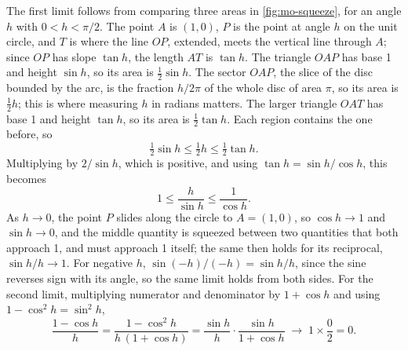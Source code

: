 The first limit follows from comparing three areas in
\cref{fig:mo-squeeze}, for an angle $h$ with $0 < h < \pi/2$. The point $A$
is $(1, 0)$, $P$ is the point at angle $h$ on the unit circle, and $T$ is
where the line $OP$, extended, meets the vertical line through $A$; since
$OP$ has slope $\tan h$, the length $AT$ is $\tan h$. The triangle $OAP$
has base 1 and height $\sin h$, so its area is $\tfrac12\sin h$. The
sector $OAP$, the slice of the disc bounded by the arc, is the fraction
$h/2\pi$ of the whole disc of area $\pi$, so its area is $\tfrac12 h$;
this is where measuring $h$ in radians matters. The larger triangle $OAT$
has base 1 and height $\tan h$, so its area is $\tfrac12\tan h$. Each
region contains the one before, so
\begin{equation*}
   \tfrac12\sin h \le \tfrac12 h \le \tfrac12\tan h .
\end{equation*}
Multiplying by $2/\sin h$, which is positive, and using $\tan h = \sin
h/\cos h$, this becomes
\begin{equation*}
   1 \le \frac{h}{\sin h} \le \frac{1}{\cos h} .
\end{equation*}
As $h \to 0$, the point $P$ slides along the circle to $A = (1, 0)$, so
$\cos h \to 1$ and $\sin h \to 0$, and the middle quantity is squeezed between
two quantities that both approach 1, and must approach 1 itself; the same
then holds for its reciprocal, $\sin h/h \to 1$. For negative $h$,
$\sin(-h)/(-h) = \sin h/h$, since the sine reverses sign with its angle,
so the same limit holds from both sides. For the second limit,
multiplying numerator and denominator by $1 + \cos h$ and using $1 -
\cos^2 h = \sin^2 h$,
\begin{equation*}
   \frac{1 - \cos h}{h} = \frac{1 - \cos^2 h}{h\,(1 + \cos h)}
   = \frac{\sin h}{h}\cdot\frac{\sin h}{1 + \cos h}
   \;\longrightarrow\; 1\times\frac{0}{2} = 0 .
\end{equation*}

